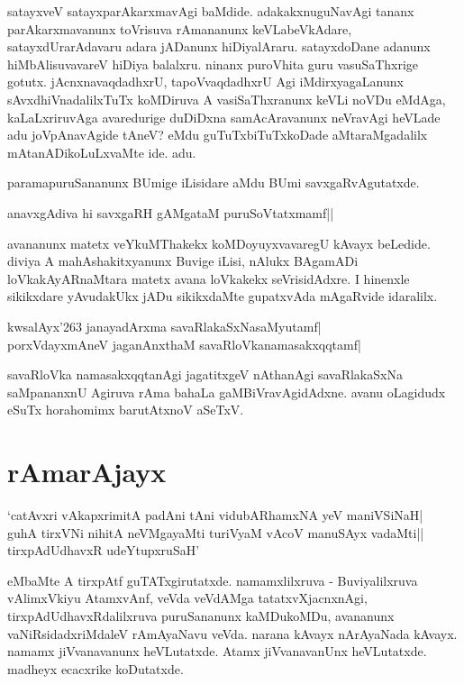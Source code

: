 satayxveV satayxparAkarxmavAgi baMdide. adakakxnuguNavAgi tananx parAkarxmavanunx toVrisuva rAmananunx keVLabeVkAdare, satayxdUrarAdavaru adara jADanunx hiDiyalAraru. satayxdoDane adanunx hiMbAlisuvavareV hiDiya balalxru. ninanx puroVhita guru vasuSaThxrige gotutx. jAcnxnavaqdadhxrU, tapoVvaqdadhxrU Agi iMdirxyagaLanunx sAvxdhiVnadalilxTuTx koMDiruva A vasiSaThxranunx keVLi noVDu eMdAga, kaLaLxriruvAga avaredurige duDiDxna samAcAravanunx neVravAgi heVLade adu joVpAnavAgide tAneV? eMdu guTuTxbiTuTxkoDade aMtaraMgadalilx mAtanADikoLuLxvaMte ide. adu. 

paramapuruSananunx BUmige iLisidare aMdu BUmi savxgaRvAgutatxde. 

\begin{shloka}
anavxgAdiva hi savxgaRH gAMgataM puruSoVtatxmamf||
\end{shloka}

avananunx matetx veYkuMThakekx koMDoyuyxvavaregU kAvayx beLedide. diviya A mahAshakitxyanunx Buvige iLisi, nAlukx BAgamADi loVkakAyARnaMtara matetx avana loVkakekx seVrisidAdxre. I hinenxle sikikxdare yAvudakUkx jADu sikikxdaMte gupatxvAda mAgaRvide idaralilx. 

\begin{shloka}
kwsalAyx\char'263 janayadArxma‌ savaRlakaSxNasaMyutamf|\label{252}\\
porxVdayxmAneV jaganAnxthaM savaRloVkanamasakxqqtamf|
\end{shloka}

savaRloVka namasakxqqtanAgi jagatitxgeV nAthanAgi savaRlakaSxNa saMpananxnU Agiruva rAma bahaLa gaMBiVravAgidAdxne. avanu oLagidudx eSuTx horahomimx barutAtxnoV aSeTxV. 

\section*{rAmarAjayx}

\begin{shloka}
`catAvxri vAkapxrimitA padAni tAni vidubARhamxNA yeV maniVSiNaH|\\
guhA tirxVNi nihitA neVMgayaMti turiVyaM vAcoV manuSAyx vadaMti||\\
tirxpAdUdhavxR udeYtupxruSaH'\label{252a}
\end{shloka}

eMbaMte A tirxpAtf guTATxgirutatxde. namamxlilxruva - Buviyalilxruva vAlimxVkiyu AtamxvAnf, veVda veVdAMga tatatxvXjacnxnAgi, tirxpAdUdhavxRdalilxruva puruSananunx kaMDukoMDu, avananunx vaNiRsidadxriMdaleV rAmAyaNavu veVda. narana kAvayx nArAyaNada kAvayx. namamx jiVvanavanunx heVLutatxde. Atamx jiVvanavanUnx heVLutatxde. madheyx ecacxrike koDutatxde. 

